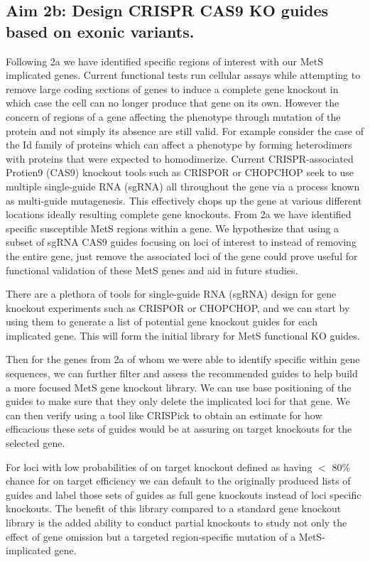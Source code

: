 \documentclass[11pt]{article}
\begin{document}
\subsection*{Aim 2b: Design CRISPR CAS9 KO guides based on exonic variants.} 

\noindent {}

Following 2a we have identified specific regions of interest with our MetS implicated genes. Current functional tests run cellular assays while attempting to remove large coding sections of genes to induce a complete gene knockout in which case the cell can no longer produce that gene on its own. However the concern of regions of a gene affecting the phenotype through mutation of the protein and not simply its absence are still valid. For example consider the case of the Id family of proteins which can affect a phenotype by forming heterodimers with proteins that were expected to homodimerize. Current CRISPR-associated Protien9 (CAS9) knockout tools such as CRISPOR or CHOPCHOP seek to use multiple single-guide RNA (sgRNA) all throughout the gene via a process known as multi-guide mutagenesis. This effectively chops up the gene at various different locations ideally resulting complete gene knockouts. From 2a we have identified specific susceptible MetS regions within a gene. We hypothesize that using a subset of sgRNA CAS9 guides focusing on loci of interest to instead of removing the entire gene, just remove the associated loci of the gene could prove useful for functional validation of these MetS genes and aid in future studies.

\noindent {}

There are a plethora of tools for single-guide RNA (sgRNA) design for gene knockout experiments such as CRISPOR or CHOPCHOP, and we can start by using them to generate a list of potential gene knockout guides for each implicated gene. This will form the initial library for MetS functional KO guides.

Then for the genes from 2a of whom we were able to identify specific within gene sequences, we can further filter and assess the recommended guides to help build a more focused MetS gene knockout library. We can use base positioning of the guides to make sure that they only delete the implicated loci for that gene. We can then verify using a tool like CRISPick to obtain an estimate for how efficacious these sets of guides would be at assuring on target knockouts for the selected gene. 

For loci with low probabilities of on target knockout defined as having $<$ 80\% chance for on target efficiency we can default to the originally produced lists of guides and label those sets of guides as full gene knockouts instead of loci specific knockouts. The benefit of this library compared to a standard gene knockout library is the added ability to conduct partial knockouts to study not only the effect of gene omission but a targeted region-specific mutation of a MetS-implicated gene.
\end{document}

